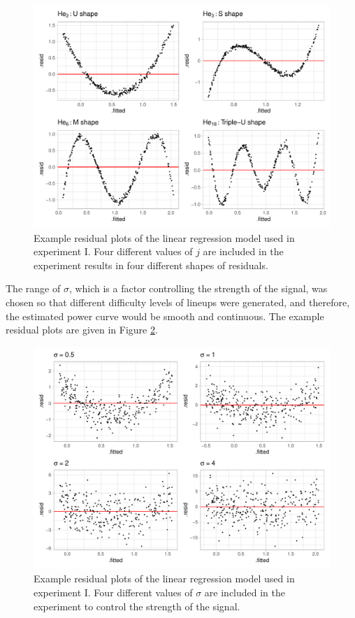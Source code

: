 \documentclass[]{interact}
\theoremstyle{plain}%
\theoremstyle{definition}
\theoremstyle{remark}
\begin{document}
\begin{figure}
\includegraphics[width=1\linewidth]{paper_comparison_files/figure-latex/different-shape-of-herimite-1} \caption{Example residual plots of the linear regression model used in experiment I. Four different values of $j$ are included in the experiment results in four different shapes of residuals.}\label{fig:different-shape-of-herimite}
\end{figure}

The range of \(\sigma\), which is a factor controlling the strength of
the signal, was chosen so that different difficulty levels of lineups
were generated, and therefore, the estimated power curve would be smooth
and continuous. The example residual plots are given in Figure
\ref{fig:different-sigma}.

\begin{figure}
\includegraphics[width=1\linewidth]{paper_comparison_files/figure-latex/different-sigma-1} \caption{Example residual plots of the linear regression model used in experiment I. Four different values of $\sigma$ are included in the experiment to control the strength of the signal.}\label{fig:different-sigma}
\end{figure}
\end{document}
